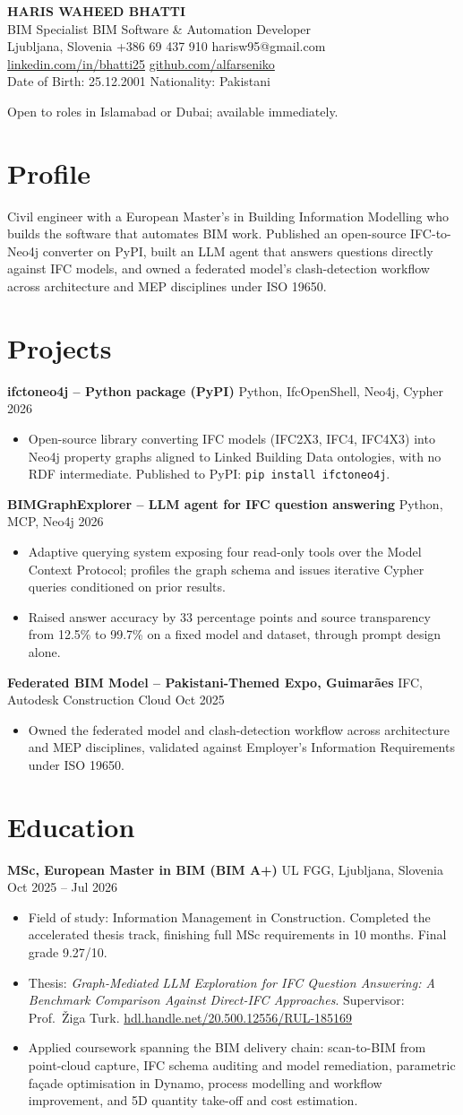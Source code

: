 \documentclass[a4paper,10.5pt]{article}
\newcommand{\datefill}{\dotfill}
\newcommand{\entry}[3]{\vspace{2.5pt}\noindent\textbf{#1} \textbar{} #2 \datefill{} #3\par\vspace{0.5pt}}
\newcommand{\ROLELINE}{BIM Specialist \textbar{} BIM Software \& Automation Developer}
\newcommand{\projIfcToNeo}{%
\entry{ifctoneo4j -- Python package (PyPI)}{Python, IfcOpenShell, Neo4j, Cypher}{2026}
\begin{itemize}
  \item Open-source library converting IFC models (IFC2X3, IFC4, IFC4X3) into Neo4j
        property graphs aligned to Linked Building Data ontologies, with no RDF
        intermediate. Published to PyPI: \texttt{pip install ifctoneo4j}.
\end{itemize}}
\newcommand{\projBIMGraph}{%
\entry{BIMGraphExplorer -- LLM agent for IFC question answering}{Python, MCP, Neo4j}{2026}
\begin{itemize}
  \item Adaptive querying system exposing four read-only tools over the Model
        Context Protocol; profiles the graph schema and issues iterative Cypher
        queries conditioned on prior results.
  \item Raised answer accuracy by 33 percentage points and source transparency from
        12.5\% to 99.7\% on a fixed model and dataset, through prompt design alone.
\end{itemize}}
\newcommand{\projGuimaraes}{%
\entry{Federated BIM Model -- Pakistani-Themed Expo, Guimar\~aes}{IFC, Autodesk Construction Cloud}{Oct 2025}
\begin{itemize}
  \item Owned the federated model and clash-detection workflow across architecture
        and MEP disciplines, validated against Employer's Information Requirements
        under ISO 19650.
\end{itemize}}
\begin{document}
\begin{center}
  {\LARGE\bfseries HARIS WAHEED BHATTI}\\[2pt]
  {\large \ROLELINE}\\[3pt]
  Ljubljana, Slovenia \textbar{} +386 69 437 910 \textbar{} harisw95@gmail.com\\
  \href{https://linkedin.com/in/bhatti25}{linkedin.com/in/bhatti25} \textbar{}
  \href{https://github.com/alfarseniko}{github.com/alfarseniko}\\
  Date of Birth: 25.12.2001 \textbar{} Nationality: Pakistani
\end{center}
\vspace{-4pt}
\noindent\small Open to roles in Islamabad or Dubai; available immediately.\normalsize

\section{Profile}

\noindent Civil engineer with a European Master's in Building Information Modelling
who builds the software that automates BIM work. Published an open-source
IFC-to-Neo4j converter on PyPI, built an LLM agent that answers questions directly
against IFC models, and owned a federated model's clash-detection workflow across
architecture and MEP disciplines under ISO 19650.

\section{Projects}

 \projIfcToNeo \projBIMGraph \projGuimaraes

\section{Education}
\entry{MSc, European Master in BIM (BIM A+)}{UL FGG, Ljubljana, Slovenia}{Oct 2025 -- Jul 2026}
\begin{itemize}
  \item Field of study: Information Management in Construction. Completed the
        accelerated thesis track, finishing full MSc requirements in 10 months.
        Final grade 9.27/10.
  \item Thesis: \textit{Graph-Mediated LLM Exploration for IFC Question Answering:
        A Benchmark Comparison Against Direct-IFC Approaches}. Supervisor:
        Prof.~\v{Z}iga Turk. \href{http://hdl.handle.net/20.500.12556/RUL-185169}{hdl.handle.net/20.500.12556/RUL-185169}
  \item Applied coursework spanning the BIM delivery chain: scan-to-BIM from point-cloud capture, IFC schema auditing and model remediation, parametric façade optimisation in Dynamo, process modelling and workflow improvement, and 5D quantity take-off and cost estimation.
\end{itemize}
\end{document}
